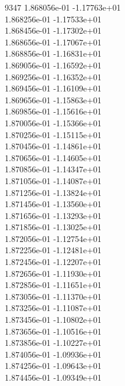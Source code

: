 9347	1.868056e-01	-1.17763e+01	\\ 	1.868256e-01	-1.17533e+01	\\ 	1.868456e-01	-1.17302e+01	\\ 	1.868656e-01	-1.17067e+01	\\ 	1.868856e-01	-1.16831e+01	\\ 	1.869056e-01	-1.16592e+01	\\ 	1.869256e-01	-1.16352e+01	\\ 	1.869456e-01	-1.16109e+01	\\ 	1.869656e-01	-1.15863e+01	\\ 	1.869856e-01	-1.15616e+01	\\ 	1.870056e-01	-1.15366e+01	\\ 	1.870256e-01	-1.15115e+01	\\ 	1.870456e-01	-1.14861e+01	\\ 	1.870656e-01	-1.14605e+01	\\ 	1.870856e-01	-1.14347e+01	\\ 	1.871056e-01	-1.14087e+01	\\ 	1.871256e-01	-1.13824e+01	\\ 	1.871456e-01	-1.13560e+01	\\ 	1.871656e-01	-1.13293e+01	\\ 	1.871856e-01	-1.13025e+01	\\ 	1.872056e-01	-1.12754e+01	\\ 	1.872256e-01	-1.12481e+01	\\ 	1.872456e-01	-1.12207e+01	\\ 	1.872656e-01	-1.11930e+01	\\ 	1.872856e-01	-1.11651e+01	\\ 	1.873056e-01	-1.11370e+01	\\ 	1.873256e-01	-1.11087e+01	\\ 	1.873456e-01	-1.10802e+01	\\ 	1.873656e-01	-1.10516e+01	\\ 	1.873856e-01	-1.10227e+01	\\ 	1.874056e-01	-1.09936e+01	\\ 	1.874256e-01	-1.09643e+01	\\ 	1.874456e-01	-1.09349e+01	\\ \hline
